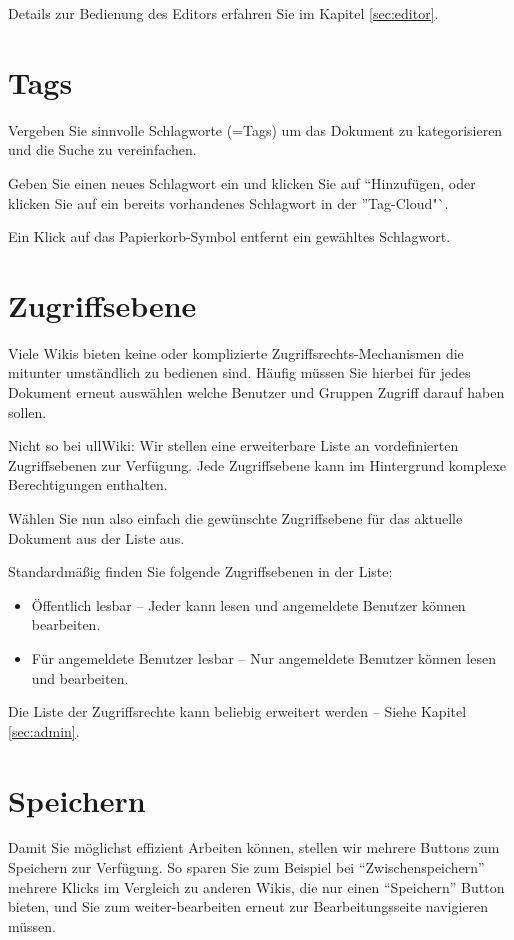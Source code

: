 \documentclass[article, a4paper, oneside, 11pt]{memoir}
\begin{document}
Details zur Bedienung des Editors erfahren Sie im Kapitel \vref{sec:editor}.


\section{Tags}
Vergeben Sie sinnvolle Schlagworte (=Tags) um das Dokument zu kategorisieren und die Suche zu vereinfachen. 

Geben Sie einen neues Schlagwort ein und klicken Sie auf "`Hinzufügen, oder klicken Sie auf ein bereits vorhandenes Schlagwort in der "'Tag-Cloud"`.

Ein Klick auf das Papierkorb-Symbol entfernt ein gewähltes Schlagwort.



\section{Zugriffsebene}
Viele Wikis bieten keine oder komplizierte Zugriffsrechts-Mechanismen die mitunter umständlich zu bedienen sind. Häufig müssen Sie hierbei für jedes Dokument erneut auswählen welche Benutzer und Gruppen Zugriff darauf haben sollen.

Nicht so bei ullWiki: Wir stellen eine erweiterbare Liste an vordefinierten Zugriffsebenen zur Verfügung. Jede Zugriffsebene kann im Hintergrund komplexe Berechtigungen enthalten.

Wählen Sie nun also einfach die gewünschte Zugriffsebene für das aktuelle Dokument aus der Liste aus.

Standardmäßig finden Sie folgende Zugriffsebenen in der Liste:

\begin{itemize}
\item Öffentlich lesbar – Jeder kann lesen und angemeldete Benutzer können bearbeiten.
\item Für angemeldete Benutzer lesbar – Nur angemeldete Benutzer können lesen und bearbeiten.
\end{itemize}
Die Liste der Zugriffsrechte kann beliebig erweitert werden – Siehe Kapitel \vref{sec:admin}.

\section{Speichern}
Damit Sie möglichst effizient Arbeiten können, stellen wir mehrere Buttons zum Speichern zur Verfügung. So sparen Sie zum Beispiel bei "`Zwischenspeichern"' mehrere Klicks im Vergleich zu anderen Wikis, die nur einen "`Speichern"' Button bieten, und Sie zum weiter-bearbeiten erneut zur Bearbeitungsseite navigieren müssen.
\end{document}
